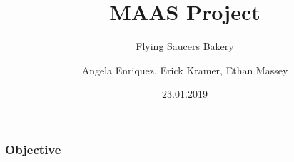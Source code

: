 \documentclass{beamer}
\author[Enriquez, Kramer, Massey]{Angela Enriquez, Erick Kramer, Ethan Massey}
\title{MAAS Project}
\subtitle{Flying Saucers Bakery}
\institute[HBRS]{Hochschule Bonn-Rhein-Sieg}
\date{23.01.2019}
\begin{document}
	
		\begin{frame}
			\titlepage
		\end{frame}
		
		\begin{frame}
			\frametitle{Objective}

		\end{frame}
\end{document}
